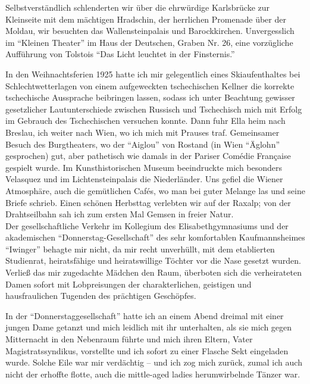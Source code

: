 \documentclass[a5paper,pagesize,10pt,twoside=true]{scrbook}
\renewcommand{\marginpar}[2][]{}
\begin{document}
Selbstverständlich schlenderten wir über die ehrwürdige Karlsbrücke zur Kleinseite mit dem mächtigen Hradschin, der herrlichen Promenade über der Moldau, wir besuchten das Wallensteinpalais und Barockkirchen. Unvergesslich im \enquote{Kleinen Theater} im Haus der Deutschen, Graben Nr. 26, eine vorzügliche Aufführung von Tolstois \enquote{Das Licht leuchtet in der Finsternis.}

\marginpar{3. Heft von Mama, noch zu gliedern}
In den Weihnachtsferien 1925 hatte ich mir gelegentlich eines Skiaufenthaltes bei Schlechtwetterlagen von einem aufgeweckten tschechischen Kellner die korrekte tschechische Aussprache beibringen lassen, sodass ich unter Beachtung gewisser gesetzlicher Lautunterschiede zwischen Russisch und Tschechisch mich mit Erfolg im Gebrauch des Tschechischen versuchen konnte. Dann fuhr Ella heim nach Breslau, ich weiter nach Wien, wo ich mich mit Prauses traf. Gemeinsamer Besuch des Burgtheaters, wo der \enquote{Aiglou} von Rostand (in Wien \enquote{Äglohn} gesprochen) gut, aber pathetisch wie damals in der Pariser Comédie Française gespielt wurde. Im Kunsthistorischen Museum beeindruckte mich besonders Velasquez und im Lichtensteinpalais die Niederländer. Uns gefiel die Wiener Atmosphäre, auch die gemütlichen Cafés, wo man bei guter Melange las und seine Briefe schrieb. Einen schönen Herbsttag verlebten wir auf der Raxalp; von der Drahtseilbahn sah ich zum ersten Mal Gemsen in freier Natur.\\

Der gesellschaftliche Verkehr im Kollegium des Elisabethgymnasiums und der akademischen \enquote{Donnerstag-Gesellschaft} des sehr komfortablen Kaufmannsheimes \enquote{Iwinger} behagte mir nicht, da mir recht unverhüllt, mit dem etablierten Studienrat, heiratsfähige und heiratswillige Töchter vor die Nase gesetzt wurden. Verließ das mir zugedachte Mädchen den Raum, überboten sich die verheirateten Damen sofort mit Lobpreisungen der charakterlichen, geistigen und hausfraulichen Tugenden des prächtigen Geschöpfes.

In der \enquote{Donnerstaggesellschaft} hatte ich an einem Abend dreimal mit einer jungen Dame getanzt und mich leidlich mit ihr unterhalten, als sie mich gegen Mitternacht in den Nebenraum führte und mich ihren Eltern, Vater Magistratssyndikus, vorstellte und ich sofort zu einer Flasche Sekt eingeladen wurde. Solche Eile war mir verdächtig -- und ich zog mich zurück, zumal ich auch nicht der erhoffte flotte, auch die mittle-aged ladies herumwirbelnde Tänzer war.
\end{document}
